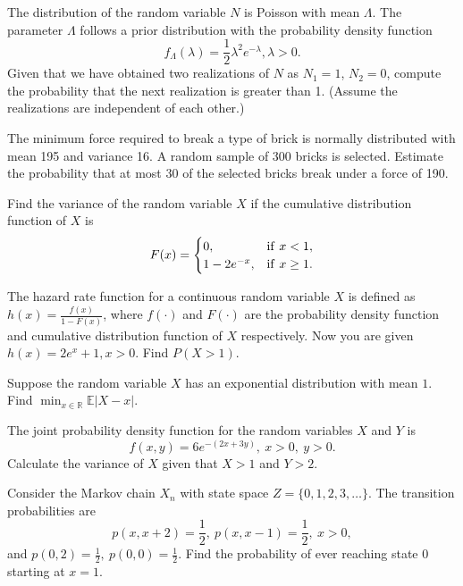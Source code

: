 \begin{problem}     The distribution of the random variable $N$ is Poisson with mean $\Lambda$. The parameter $\Lambda$ follows a prior distribution with the probability density function
    $$f_{\Lambda}(\lambda) = \frac{1}{2} \lambda^2 e^{-\lambda}, \lambda>0.$$
   Given that we have obtained two realizations of $N$ as $N_1 = 1$, $N_2 = 0$, compute the probability that the next realization is greater than 1. (Assume the realizations are independent of each other.)
\end{problem}

\begin{problem}     The minimum force required to break a type of brick is normally distributed with mean 195 and variance 16. A random sample of 300 bricks is selected.
    Estimate the probability that at most 30 of the selected bricks break under a force of 190.
\end{problem}

\begin{problem}     Find the variance of the random variable $X$ if the cumulative distribution function of $X$ is
    $$F(x) = \begin{cases} 0, & {\rm if} \ x < 1, \\ 1 - 2e^{-x}, & {\rm if} \ x \geq 1. \end{cases}$$
\end{problem}

\begin{problem}   The hazard rate function for a continuous random variable $X$ is defined as $h(x) = \frac{f(x)}{1-F(x)}$, where $f(\cdot)$ and $F(\cdot)$ are the probability density
  function and cumulative distribution function of $X$ respectively. Now you are given $h(x) = 2e^{x} + 1, x>0$. Find $P(X>1)$.
\end{problem}

\begin{problem}    Suppose the random variable $X$ has an exponential distribution with mean $1$. Find $\min_{x \in \mathbb{R}} \mathbb{E}|X-x|$. 
\end{problem}

\begin{problem}     The joint probability density function for the random variables $X$ and $Y$ is 
      $$f(x, y) = 6e^{-(2x+3y)}, \ x>0, \ y>0.$$
    Calculate the variance of $X$ given that $X>1$ and $Y>2$.
\end{problem}

\begin{problem}    Consider the Markov chain $X_n$ with state space $Z = \{0, 1, 2, 3, \ldots\}$. The transition probabilities are 
     $$p(x, x+2) = \frac{1}{2}, \ p(x, x-1) = \frac{1}{2}, \ x>0,$$
     and $p(0, 2)=\frac{1}{2}, \ p(0, 0)=\frac{1}{2}$. Find the probability of ever reaching state 0 starting at $x=1$. 
\end{problem}


